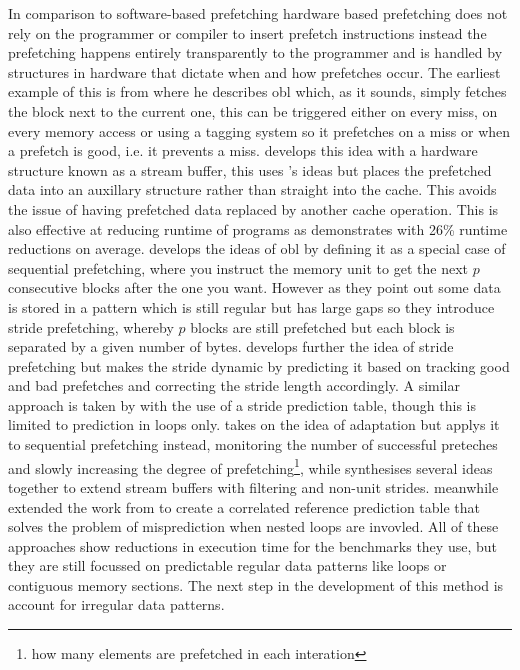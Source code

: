In comparison to software-based prefetching hardware based prefetching does not rely on the programmer or compiler to insert prefetch instructions instead the prefetching happens entirely transparently to the programmer and is handled by structures in hardware that dictate when and how prefetches occur. The earliest example of this is from \citet{smithCacheMemories1982} where he describes \gls{obl} which, as it sounds, simply fetches the block next to the current one, this can be triggered either on every miss, on every memory access or using a tagging system so it prefetches on a miss or when a prefetch is good, i.e. it prevents a miss. \citet{jouppiImprovingDirectmappedCache1990} develops this idea with a hardware structure known as a stream buffer, this uses \citeauthor{smithCacheMemories1982}'s ideas but places the prefetched data into an auxillary structure rather than straight into the cache. This avoids the issue of having prefetched data replaced by another cache operation. This is also effective at reducing runtime of programs as \citet{farkasHowUsefulAre1995} demonstrates with 26\% runtime reductions on average. \citet{fuDataPrefetchingMultiprocessor1991} develops the ideas of \gls{obl} by defining it as a special case of sequential prefetching, where you instruct the memory unit to get the next $p$ consecutive blocks after the one you want. However as they point out some data is stored in a pattern which is still regular but has large gaps so they introduce stride prefetching, whereby $p$ blocks are still prefetched but each block is separated by a given number of bytes. \citet{baerEffectiveOnchipPreloading1991a} develops further the idea of stride prefetching but makes the stride dynamic by predicting it based on tracking good and bad prefetches and correcting the stride length accordingly. A similar approach is taken by \citet{fuStrideDirectedPrefetching1992} with the use of a stride prediction table, though this is limited to prediction in loops only. \citet{dahlgrenFixedAdaptiveSequential1993} takes on the idea of adaptation but applys it to sequential prefetching instead, monitoring the number of successful preteches and slowly increasing the degree of prefetching\footnote{how many elements are prefetched in each interation}, while \citet{palacharlaEvaluatingStreamBuffers1994} synthesises several ideas together to extend stream buffers with filtering and non-unit strides. \citet{chenEffectiveHardwarebasedData1995} meanwhile extended the work from \citeyear{baerEffectiveOnchipPreloading1991a}\cite{baerEffectiveOnchipPreloading1991a} to create a correlated reference prediction table that solves the problem of misprediction when nested loops are invovled. All of these approaches show reductions in execution time for the benchmarks they use, but they are still focussed on predictable regular data patterns like loops or contiguous memory sections. The next step in the development of this method is account for irregular data patterns.

